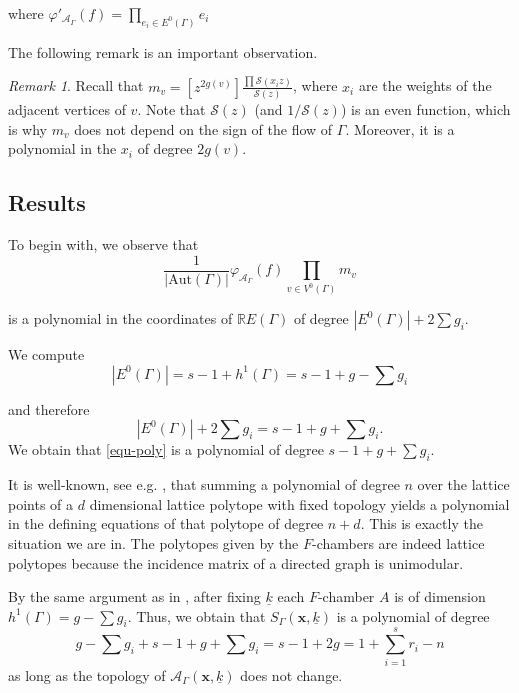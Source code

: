 \documentclass[10pt,a4paper,oneside,no-math,reqno]{amsart}%
\theoremstyle{plain}
\theoremstyle{definition}
\theoremstyle{remark}
\newtheorem{remark}[theorem]{Remark}
\numberwithin{equation}{section}
\renewcommand{\phi}{\varphi}
\newcommand{\mc}[1]{\mathcal{#1}}
\newcommand{\1}{\mathds{1}}
\newcommand{\<}{\langle}
\renewcommand{\>}{\rangle}
\begin{document}
where $\phi'_{\mathcal{A}_\Gamma}(f)=\prod_{e_i\in E^0(\Gamma)} e_i$

The following remark is an important observation.

\begin{remark}
Recall that $m_v=[z^{2g(v)}]\frac{\prod\mathcal{S}(x_iz)}{\mc{S}(z)}$, where $x_i$ are the weights of the adjacent vertices of $v$. Note that $\mathcal{S}(z)$ (and $1/\mathcal{S}(z)$) is an even function, which is why $m_v$ does not depend on the sign of the flow of $\Gamma$. Moreover, it is a polynomial in the $x_i$ of degree $2g(v)$.
\end{remark}

\subsection{Results}

To begin with, we observe that
\begin{equation}
\label{equ-poly}
    \frac{1}{|\mathrm{Aut}(\Gamma)|}\phi_{\mathcal{A}_\Gamma}(f)\prod_{v\in V^0(\Gamma)}m_v
\end{equation}

 is a polynomial in the coordinates of $\mathbb{R}E(\Gamma)$ of degree $|E^0(\Gamma)|+2\sum g_i$.

 We compute
 \begin{equation}
     |E^0(\Gamma)|=s-1+h^1(\Gamma)=s-1+g-\sum g_i
 \end{equation}

 and therefore 
 \begin{equation}
     |E^0(\Gamma)|+2\sum g_i=s-1+g+\sum g_i.
 \end{equation}
 We obtain that \cref{equ-poly} is a polynomial of degree $s-1+g+\sum g_i$.

 It is well-known, see e.g. \cite[Theorem 4.6]{AB17}, that summing a polynomial of degree $n$ over the lattice points of a $d$ dimensional lattice polytope with fixed topology yields a polynomial in the defining equations of that polytope of degree $n+d$. This is exactly the situation we are in. The polytopes given by the $F$-chambers are indeed lattice polytopes because the incidence matrix of a directed graph is unimodular.

 By the same argument as in \cite[Remark 2.11]{CJM11}, after fixing $\underline{k}$ each $F$-chamber $A$ is of dimension $h^1(\Gamma)=g-\sum g_i$.
 Thus, we obtain that $S_\Gamma(\textbf{x},\underline{k})$ is a polynomial of degree
 \begin{equation}
     g-\sum g_i+s-1+g+\sum g_i
     =
     s-1+2g
     =
     1+\sum_{i=1}^s r_i -n
 \end{equation}
 as long as the topology of $\mathcal{A}_\Gamma(\textbf{x},\underline{k})$ does not change. 
 
\end{document}
